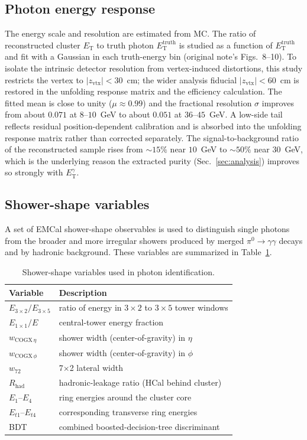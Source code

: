 \documentclass[11pt]{article}
\newcommand{\ET}{E_{\mathrm{T}}}
\newcommand{\ETg}{E_{\mathrm{T}}^{\gamma}}
\begin{document}
\subsection{Photon energy response}

The energy scale and resolution are estimated from MC. The ratio of reconstructed
cluster $\ET$ to truth photon $\ET^{\mathrm{truth}}$ is studied as a function of
$\ET^{\mathrm{truth}}$ and fit with a Gaussian in each truth-energy bin (original
note's Figs.~8--10). To isolate the intrinsic detector resolution from
vertex-induced distortions, this study restricts the vertex to $|z_{\mathrm{vtx}}|<30$~cm;
the wider analysis fiducial $|z_{\mathrm{vtx}}|<60$~cm is restored in the unfolding
response matrix and the efficiency calculation. The fitted mean is close to unity
($\mu\approx0.99$) and the fractional resolution $\sigma$ improves from about
$0.071$ at $8$--$10$~GeV to about $0.051$ at $36$--$45$~GeV. A low-side tail
reflects residual position-dependent calibration and is absorbed into the
unfolding response matrix rather than corrected separately. The
signal-to-background ratio of the reconstructed sample rises from $\sim15\%$ near
$10$~GeV to $\sim50\%$ near $30$~GeV, which is the underlying reason the extracted
purity (Sec.~\ref{sec:analysis}) improves so strongly with $\ETg$.

\subsection{Shower-shape variables}

A set of EMCal shower-shape observables is used to distinguish single photons
from the broader and more irregular showers produced by merged
$\pi^0\to\gamma\gamma$ decays and by hadronic background. These variables are
summarized in Table~\ref{tab:showershape}.

\begin{table}[h]
\centering
\caption{Shower-shape variables used in photon identification.}
\label{tab:showershape}
\begin{tabular}{ll}
\toprule
Variable & Description \\
\midrule
$E_{3\times2}/E_{3\times5}$ & ratio of energy in $3\times2$ to $3\times5$ tower windows \\
$E_{1\times1}/E$            & central-tower energy fraction \\
$w_{\mathrm{COGX}\,\eta}$   & shower width (center-of-gravity) in $\eta$ \\
$w_{\mathrm{COGX}\,\phi}$   & shower width (center-of-gravity) in $\phi$ \\
$w_{72}$                    & 7$\times$2 lateral width \\
$R_{\mathrm{had}}$          & hadronic-leakage ratio (HCal behind cluster) \\
$E_1$--$E_4$                & ring energies around the cluster core \\
$E_{t1}$--$E_{t4}$          & corresponding transverse ring energies \\
BDT                         & combined boosted-decision-tree discriminant \\
\bottomrule
\end{tabular}
\end{table}
\end{document}
